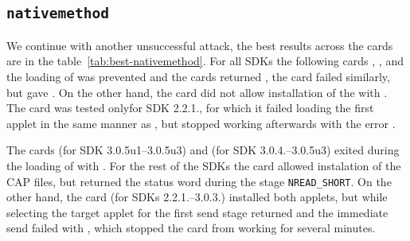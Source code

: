        







            \subsection{\texttt{nativemethod}}

            We continue with another unsuccessful attack, the best results across the cards are in the table~\ref{tab:best-nativemethod}. For all SDKs the following cards \Fcard, \Gcard, \Hcard and \Inewcard the loading of \vulnscap was prevented and the cards returned \shortswwrongdata, the card \Cnewcard failed similarly, but gave \shortswunknown. On the other hand, the card \Ccard did not allow installation of the \vulnscap with \shortswconditionsnotsatisfied. The card \Icard was tested onlyfor SDK 2.2.1., for which it failed loading the first applet in the same manner as \Ccard, but stopped working afterwards with the error \scardenottransacted.

            The cards \Acard (for SDK 3.0.5u1--3.0.5u3) and \Bcard (for SDK 3.0.4.--3.0.5u3) exited during the loading of \appletscap with \shortswwrongdata. For the rest of the SDKs the card \Acard allowed instalation of the CAP files, but returned the status word \shortswunknown during the stage \texttt{NREAD_SHORT}. On the other hand, the card \Bcard (for SDKs 2.2.1.--3.0.3.) installed both applets, but while selecting the target applet for the first send stage returned \shortswclanotsupported and the immediate send failed with \scardenottransacted, which stopped the card from working for several minutes.
            
